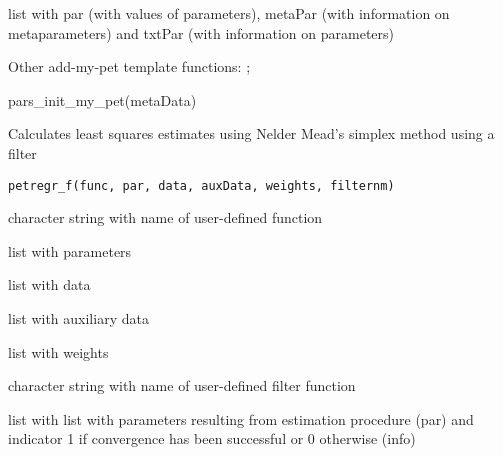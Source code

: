 \documentclass[a4paper]{book}
\begin{document}
%
\begin{Value}
list with par (with values of parameters), metaPar (with information on metaparameters) and txtPar (with information on parameters)
\end{Value}
%
\begin{SeeAlso}\relax
Other add-my-pet template functions: ;
\end{SeeAlso}
%
\begin{Examples}
\begin{ExampleCode}
pars_init_my_pet(metaData)
\end{ExampleCode}
\end{Examples}
%
\begin{Description}\relax
Calculates least squares estimates using Nelder Mead's simplex method using a filter
\end{Description}
%
\begin{Usage}
\begin{verbatim}
petregr_f(func, par, data, auxData, weights, filternm)
\end{verbatim}
\end{Usage}
%
\begin{Arguments}
\begin{ldescription}
\item[\code{func}] character string with name of user-defined function

\item[\code{par}] list with parameters

\item[\code{data}] list with data

\item[\code{auxData}] list with auxiliary data

\item[\code{weights}] list with weights

\item[\code{filternm}] character string with name of user-defined filter function
\end{ldescription}
\end{Arguments}
%
\begin{Value}
list with list with parameters resulting from estimation procedure (par)
and indicator 1 if convergence has been successful or 0 otherwise (info)
\end{Value}
\end{document}
